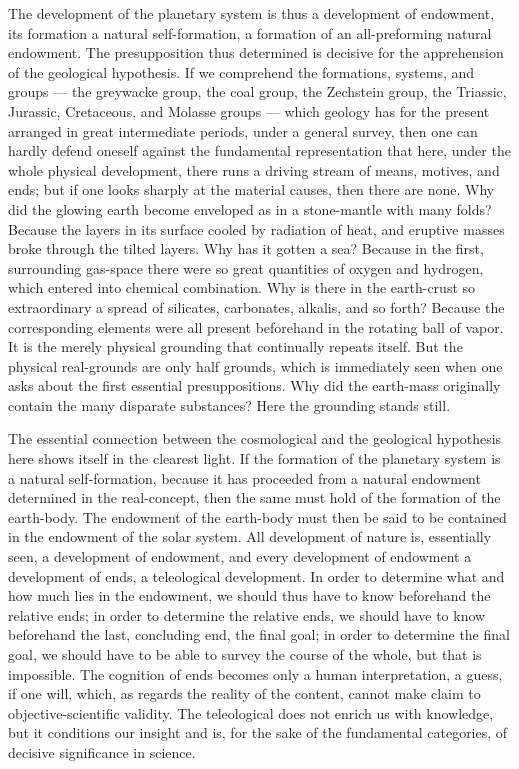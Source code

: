 \documentclass[12pt]{book}
\begin{document}
The development of the planetary system is thus a development of endowment, its formation a
natural self-formation, a formation of an all-preforming natural endowment. The presupposition
thus determined is decisive for the apprehension of the geological hypothesis. If we
comprehend the formations, systems, and groups --- the greywacke group, the coal group, the
Zechstein group, the Triassic, Jurassic, Cretaceous, and Molasse groups --- which geology has
for the present arranged in great intermediate periods, under a general survey, then one can
hardly defend oneself against the fundamental representation that here, under the whole
physical development, there runs a driving stream of means, motives, and ends; but if one
looks sharply at the material causes, then there are none. Why did the glowing earth become
enveloped as in a stone-mantle with many folds? Because the layers in its surface cooled by
radiation of heat, and eruptive masses broke through the tilted layers. Why has it gotten a
sea? Because in the first, surrounding gas-space there were so great quantities of oxygen and
hydrogen, which entered into chemical combination. Why is there in the earth-crust so
extraordinary a spread of silicates, carbonates, alkalis, and so forth? Because the
corresponding elements were all present beforehand in the rotating ball of vapor. It is the
merely physical grounding that continually repeats itself. But the physical real-grounds are
only half grounds, which is immediately seen when one asks about the first essential
presuppositions. Why did the earth-mass originally contain the many disparate substances?
Here the grounding stands still.

The essential connection between the cosmological and the geological hypothesis here shows
itself in the clearest light. If the formation of the planetary system is a natural
self-formation, because it has proceeded from a natural endowment determined in the
real-concept, then the same must hold of the formation of the earth-body. The endowment of
the earth-body must then be said to be contained in the endowment of the solar system. All
development of nature is, essentially seen, a development of endowment, and every development
of endowment a development of ends, a teleological development. In order to determine what
and how much lies in the endowment, we should thus have to know beforehand the relative ends;
in order to determine the relative ends, we should have to know beforehand the last,
concluding end, the final goal; in order to determine the final goal, we should have to be
able to survey the course of the whole, but that is impossible. The cognition of ends becomes
only a human interpretation, a guess, if one will, which, as regards the reality of the
content, cannot make claim to objective-scientific validity. The teleological does not enrich
us with knowledge, but it conditions our insight and is, for the sake of the fundamental
categories, of decisive significance in science.
\end{document}
